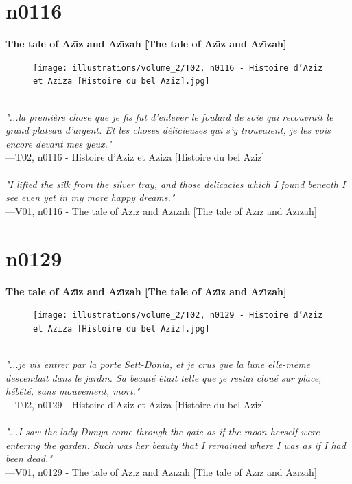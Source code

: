 \documentclass[../Carre_nights.tex]{subfiles}
\begin{document}
\newpage

\section{n0116}
\textbf{\Large{The tale of Az\={\i}z and Az\={\i}zah [The tale of Az\={\i}z and Az\={\i}zah]}} \\

\begin{figure}[ht]
\centering
\texttt{[image: illustrations/volume\_2/T02, n0116 - Histoire d’Aziz et Aziza [Histoire du bel Aziz].jpg]}
\end{figure}

\textit{\\
"...la première chose que je fis fut d’enlever le foulard de soie qui recouvrait le grand plateau d’argent. Et les choses délicieuses qui s’y trouvaient, je les vois encore devant mes yeux."} \\
—T02, n0116 - Histoire d’Aziz et Aziza [Histoire du bel Aziz] \\~\\
\textit{"I lifted the silk from the silver tray, and those delicacies which I found beneath I see even yet in my more happy dreams."} \\
—V01, n0116 - The tale of Az\={\i}z and Az\={\i}zah [The tale of Az\={\i}z and Az\={\i}zah]

\newpage

\section{n0129}
\textbf{\Large{The tale of Az\={\i}z and Az\={\i}zah [The tale of Az\={\i}z and Az\={\i}zah]}} \\

\begin{figure}[ht]
\centering
\texttt{[image: illustrations/volume\_2/T02, n0129 - Histoire d’Aziz et Aziza [Histoire du bel Aziz].jpg]}
\end{figure}

\textit{\\
"...je vis entrer par la porte Sett-Donia, et je crus que la lune elle-même descendait dans le jardin. Sa beauté était telle que je restai cloué sur place, hébété, sans mouvement, mort."} \\
—T02, n0129 - Histoire d’Aziz et Aziza [Histoire du bel Aziz] \\~\\
\textit{"...I saw the lady Dunya come through the gate as if the moon herself were entering the garden. Such was her beauty that I remained where I was as if I had been dead."} \\
—V01, n0129 - The tale of Az\={\i}z and Az\={\i}zah [The tale of Az\={\i}z and Az\={\i}zah]
\end{document}
